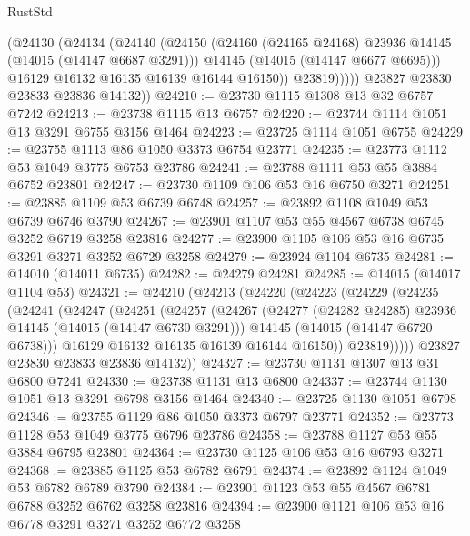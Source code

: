 \begin{lexlean}{RustStd}
\begin{coremodule}
                (@24130
                  (@24134
                    (@24140
                      (@24150
                        (@24160 (@24165 @24168) @23936 @14145 (@14015 (@14147 @6687 @3291)))
                        @14145
                        (@14015 (@14147 @6677 @6695)))
                      @16129
                      @16132
                      @16135
                      @16139
                      @16144
                      @16150))
                  @23819)))))
        @23827
        @23830
        @23833
        @23836
        @14132))
@24210 := @23730 @1115 @1308 @13 @32 @6757 @7242
@24213 := @23738 @1115 @13 @6757
@24220 := @23744 @1114 @1051 @13 @3291 @6755 @3156 @1464
@24223 := @23725 @1114 @1051 @6755
@24229 := @23755 @1113 @86 @1050 @3373 @6754 @23771
@24235 := @23773 @1112 @53 @1049 @3775 @6753 @23786
@24241 := @23788 @1111 @53 @55 @3884 @6752 @23801
@24247 := @23730 @1109 @106 @53 @16 @6750 @3271
@24251 := @23885 @1109 @53 @6739 @6748
@24257 := @23892 @1108 @1049 @53 @6739 @6746 @3790
@24267 := @23901 @1107 @53 @55 @4567 @6738 @6745 @3252 @6719 @3258 @23816
@24277 := @23900 @1105 @106 @53 @16 @6735 @3291 @3271 @3252 @6729 @3258
@24279 := @23924 @1104 @6735
@24281 := @14010 (@14011 @6735)
@24282 := @24279 @24281
@24285 := @14015 (@14017 @1104 @53)
@24321 := @24210
    (@24213
      (@24220
        (@24223
          (@24229
            (@24235
              (@24241
                (@24247
                  (@24251
                    (@24257
                      (@24267
                        (@24277 (@24282 @24285) @23936 @14145 (@14015 (@14147 @6730 @3291)))
                        @14145
                        (@14015 (@14147 @6720 @6738)))
                      @16129
                      @16132
                      @16135
                      @16139
                      @16144
                      @16150))
                  @23819)))))
        @23827
        @23830
        @23833
        @23836
        @14132))
@24327 := @23730 @1131 @1307 @13 @31 @6800 @7241
@24330 := @23738 @1131 @13 @6800
@24337 := @23744 @1130 @1051 @13 @3291 @6798 @3156 @1464
@24340 := @23725 @1130 @1051 @6798
@24346 := @23755 @1129 @86 @1050 @3373 @6797 @23771
@24352 := @23773 @1128 @53 @1049 @3775 @6796 @23786
@24358 := @23788 @1127 @53 @55 @3884 @6795 @23801
@24364 := @23730 @1125 @106 @53 @16 @6793 @3271
@24368 := @23885 @1125 @53 @6782 @6791
@24374 := @23892 @1124 @1049 @53 @6782 @6789 @3790
@24384 := @23901 @1123 @53 @55 @4567 @6781 @6788 @3252 @6762 @3258 @23816
@24394 := @23900 @1121 @106 @53 @16 @6778 @3291 @3271 @3252 @6772 @3258

\end{coremodule}
\end{lexlean}
